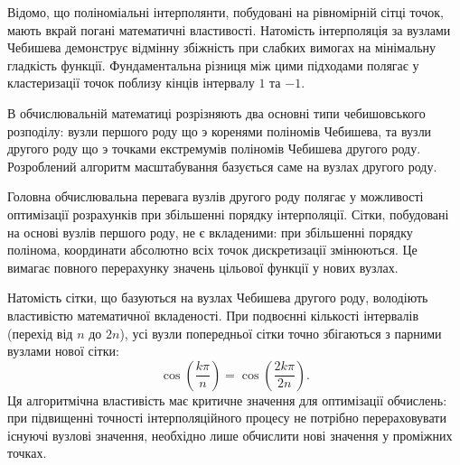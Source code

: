 Відомо, що поліноміальні інтерполянти, побудовані на рівномірній сітці точок, мають вкрай погані математичні властивості. Натомість інтерполяція за вузлами Чебишева демонструє відмінну збіжність при слабких вимогах на мінімальну гладкість функції. Фундаментальна різниця між цими підходами полягає у кластеризації точок поблизу кінців інтервалу $1$ та $-1$.

В обчислювальній математиці розрізняють два основні типи чебишовського розподілу: вузли першого роду що э коренями поліномів Чебишева, та вузли другого роду що э точками екстремумів поліномів Чебишева другого роду. Розроблений алгоритм масштабування базується саме на вузлах другого роду.

Головна обчислювальна перевага вузлів другого роду полягає у можливості оптимізації розрахунків при збільшенні порядку інтерполяції. Сітки, побудовані на основі вузлів першого роду, не є вкладеними: при збільшенні порядку полінома, координати абсолютно всіх точок дискретизації змінюються. Це вимагає повного перерахунку значень цільової функції у нових вузлах.

Натомість сітки, що базуються на вузлах Чебишева другого роду, володіють властивістю математичної вкладеності. При подвоєнні кількості інтервалів (перехід від $n$ до $2n$), усі вузли попередньої сітки точно збігаються з парними вузлами нової сітки:
\begin{equation}
	\cos\left(\frac{k\pi}{n}\right) = \cos\left(\frac{2k\pi}{2n}\right).
\end{equation}
Ця алгоритмічна властивість має критичне значення для оптимізації обчислень: при підвищенні точності інтерполяційного процесу не потрібно перераховувати існуючі вузлові значення, необхідно лише обчислити нові значення у проміжних точках.